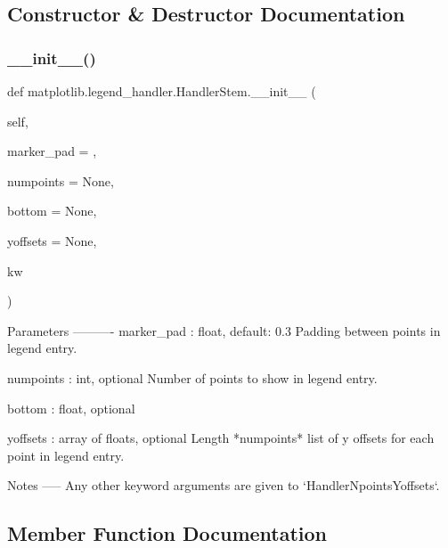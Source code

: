 \subsection{Constructor \& Destructor Documentation}
\mbox{\label{classmatplotlib_1_1legend__handler_1_1HandlerStem_af2251ec0e25de0c8384843206629041b}} 
\subsubsection{\texorpdfstring{\+\_\+\+\_\+init\+\_\+\+\_\+()}{\_\_init\_\_()}}
{\footnotesize\ttfamily def matplotlib.\+legend\+\_\+handler.\+Handler\+Stem.\+\_\+\+\_\+init\+\_\+\+\_\+ (\begin{DoxyParamCaption}\item[{}]{self,  }\item[{}]{marker\+\_\+pad = {},  }\item[{}]{numpoints = {\ttfamily None},  }\item[{}]{bottom = {\ttfamily None},  }\item[{}]{yoffsets = {\ttfamily None},  }\item[{}]{kw }\end{DoxyParamCaption})}

\begin{DoxyVerb}Parameters
----------
marker_pad : float, default: 0.3
    Padding between points in legend entry.

numpoints : int, optional
    Number of points to show in legend entry.

bottom : float, optional

yoffsets : array of floats, optional
    Length *numpoints* list of y offsets for each point in
    legend entry.

Notes
-----
Any other keyword arguments are given to `HandlerNpointsYoffsets`.
\end{DoxyVerb}
 

\subsection{Member Function Documentation}
\mbox{\label{classmatplotlib_1_1legend__handler_1_1HandlerStem_aa27400d30978a8045efba52e1236114f}} 
